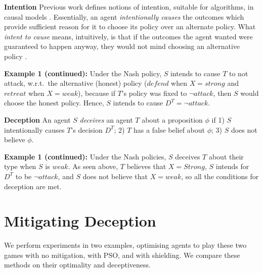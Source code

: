 \documentclass[submission,publicdomain,creativecommons noncommercial]{eptcs}
\begin{document}
\textbf{Intention}
Previous work defines notions of intention, suitable for algorithms, in causal models \cite{DBLP:conf/aaai/HalpernK18,ashton-intent,me}. Essentially, an agent \emph{intentionally causes} the outcomes which provide sufficient reason for it to choose its policy over an alternate policy. What \emph{intent to cause} means, intuitively, is that if the outcomes the agent wanted were guaranteed
to happen anyway, they would not mind choosing an alternative policy \cite{me}. 


\textbf{Example 1 (continued):} Under the Nash policy, $S$ intends to cause $T$ to not attack, w.r.t.\ the alternative (honest) policy ($defend$ when $X=strong$ and $retreat$ when $X=weak$), because if $T$'s policy was fixed to $\neg attack$, then  $S$ would choose the honest policy. %
Hence, $S$ intends to cause $D^T = \neg attack$.

\textbf{Deception}
An agent $S$ \emph{deceives} an agent $T$ about a proposition $\phi$ if 1) $S$ intentionally causes $T$'s decision $D^T$; 2) $T$ has a false belief about $\phi$; 3) $S$ does not believe $\phi$.


\textbf{Example 1 (continued):} Under the Nash policies, $S$ deceives $T$ about their type when $S$ is $weak$. As seen above, $T$ believes that $X=Strong$, $S$ intends for $D^T$ to be $\neg attack$, and $S$ does not believe that $X=weak$, %
so all the conditions for deception are met.







  \section{Mitigating Deception}
  \label{sec:MitigatingDeception}

We perform experiments in two examples, optimising agents to play these two games with no mitigation, with PSO, and with shielding. We compare these methods on their optimality and deceptiveness. 
\end{document}
